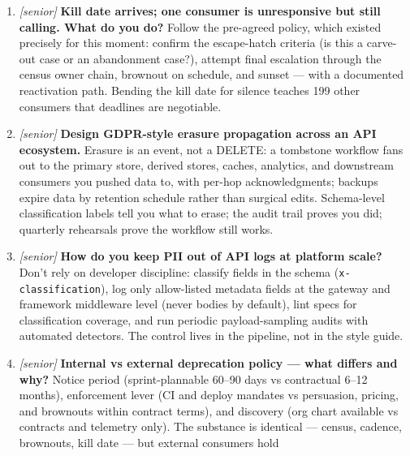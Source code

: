 \begin{enumerate}[label=\textbf{Q\arabic*.}, leftmargin=1.7cm]
        seam: everything a caller can see is standardized; everything
        behind the route table is the team's business. Revisit the line
        only with telemetry --- if an ungoverned internal choice keeps
        causing cross-team incidents, it earns promotion into the guide
        via ADR, not via decree.
  \item \emph{[senior]} \textbf{Kill date arrives; one consumer is
        unresponsive but still calling. What do you do?} Follow the
        pre-agreed policy, which existed precisely for this moment:
        confirm the escape-hatch criteria (is this a carve-out case or an
        abandonment case?), attempt final escalation through the census
        owner chain, brownout on schedule, and sunset --- with a
        documented reactivation path. Bending the kill date for silence
        teaches 199 other consumers that deadlines are negotiable.
  \item \emph{[senior]} \textbf{Design GDPR-style erasure propagation
        across an API ecosystem.} Erasure is an event, not a DELETE:
        a tombstone workflow fans out to the primary store, derived
        stores, caches, analytics, and downstream consumers you pushed
        data to, with per-hop acknowledgments; backups expire data by
        retention schedule rather than surgical edits. Schema-level
        classification labels tell you what to erase; the audit trail
        proves you did; quarterly rehearsals prove the workflow still
        works.
  \item \emph{[senior]} \textbf{How do you keep PII out of API logs at
        platform scale?} Don't rely on developer discipline: classify
        fields in the schema (\texttt{x-classification}), log only
        allow-listed metadata fields at the gateway and framework
        middleware level (never bodies by default), lint specs for
        classification coverage, and run periodic payload-sampling audits
        with automated detectors. The control lives in the pipeline, not
        in the style guide.
  \item \emph{[senior]} \textbf{Internal vs external deprecation policy
        --- what differs and why?} Notice period (sprint-plannable
        60--90 days vs contractual 6--12 months), enforcement lever (CI
        and deploy mandates vs persuasion, pricing, and brownouts within
        contract terms), and discovery (org chart available vs contracts
        and telemetry only). The substance is identical --- census,
        cadence, brownouts, kill date --- but external consumers hold

\end{enumerate}
